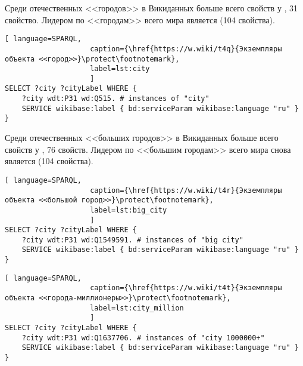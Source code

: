 Среди отечественных <<городов>> в Викиданных больше всего свойств 
у , 31 свойство\autocite{city_prowd}. 
Лидером по <<городам>> всего мира является  (104 свойства).

\begin{lstlisting}[ language=SPARQL, 
                    caption={\href{https://w.wiki/t4q}{Экземпляры объекта <<город>>}\protect\footnotemark},
                    label=lst:city
                    ]
SELECT ?city ?cityLabel WHERE {
	?city wdt:P31 wd:Q515. # instances of "city"
	SERVICE wikibase:label { bd:serviceParam wikibase:language "ru" }
}
\end{lstlisting}

Среди отечественных <<больших городов>> в Викиданных больше всего свойств 
у , 76 свойств\autocite{big_city_prowd}. 
Лидером по <<большим городам>> всего мира снова является  (104 свойства).

\begin{lstlisting}[ language=SPARQL, 
                    caption={\href{https://w.wiki/t4r}{Экземпляры объекта <<большой город>>}\protect\footnotemark},
                    label=lst:big_city
                    ]
SELECT ?city ?cityLabel WHERE {
	?city wdt:P31 wd:Q1549591. # instances of "big city"    
	SERVICE wikibase:label { bd:serviceParam wikibase:language "ru" }
}
\end{lstlisting}

\begin{lstlisting}[ language=SPARQL, 
                    caption={\href{https://w.wiki/t4t}{Экземпляры объекта <<города-миллионеры>>}\protect\footnotemark},
                    label=lst:city_million
                    ]
SELECT ?city ?cityLabel WHERE {
	?city wdt:P31 wd:Q1637706. # instances of "city 1000000+" 
	SERVICE wikibase:label { bd:serviceParam wikibase:language "ru" }
}
\end{lstlisting}

